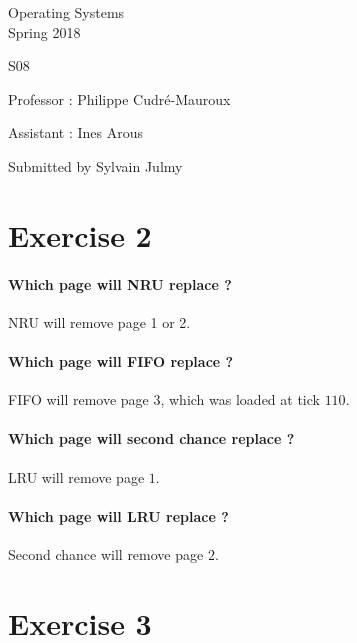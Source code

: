 \documentclass[a4paper,11pt]{report}
\author{Sylvain Julmy}
\date{\today}
\begin{document}
\begin{center}
  \Large{
    Operating Systems\\
    Spring 2018
  }
  
  \noindent\makebox[\linewidth]{\rule{\linewidth}{0.4pt}}
  S08
  \noindent\makebox[\linewidth]{\rule{\linewidth}{0.4pt}}
  \begin{flushleft}
    Professor : Philippe Cudré-Mauroux

    Assistant : Ines Arous
  \end{flushleft}
  
  \noindent\makebox[\linewidth]{\rule{\linewidth}{0.4pt}}

  Submitted by Sylvain Julmy
  
  \noindent\makebox[\linewidth]{\rule{\textwidth}{1pt}}
\end{center}

\section*{Exercise 2}

\paragraph{Which page will NRU replace ?}

NRU will remove page 1 or 2.

\paragraph{Which page will FIFO replace ?}

FIFO will remove page 3, which was loaded at tick $110$.

\paragraph{Which page will second chance replace ?}

LRU will remove page $1$.

\paragraph{Which page will LRU replace ?}

Second chance will remove page $2$.

\section*{Exercise 3}
\end{document}
